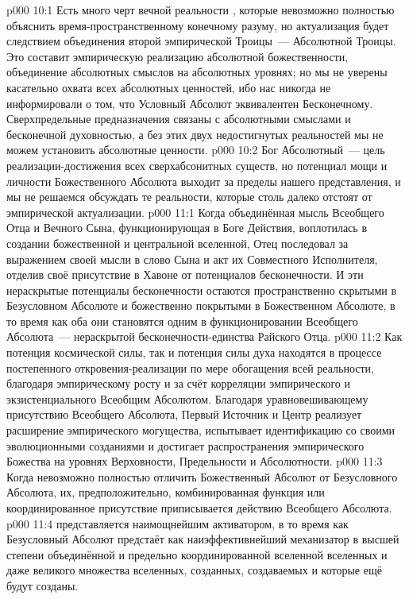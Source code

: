 \vs p000 10:1 Есть много черт вечной реальности , которые невозможно полностью объяснить время\hyp{}пространственному конечному разуму, но актуализация  будет следствием объединения второй эмпирической Троицы~--- Абсолютной Троицы. Это составит эмпирическую реализацию абсолютной божественности, объединение абсолютных смыслов на абсолютных уровнях; но мы не уверены касательно охвата всех абсолютных ценностей, ибо нас никогда не информировали о том, что Условный Абсолют эквивалентен Бесконечному. Сверхпредельные предназначения связаны с абсолютными смыслами и бесконечной духовностью, а без этих двух недостигнутых реальностей мы не можем установить абсолютные ценности.
\vs p000 10:2 Бог Абсолютный~--- цель реализации\hyp{}достижения всех сверхабсонитных существ, но потенциал мощи и личности Божественного Абсолюта выходит за пределы нашего представления, и мы не решаемся обсуждать те реальности, которые столь далеко отстоят от эмпирической актуализации.
\vs p000 11:1 Когда объединённая мысль Всеобщего Отца и Вечного Сына, функционирующая в Боге Действия, воплотилась в создании божественной и центральной вселенной, Отец последовал за выражением своей мысли в слово Сына и акт их Совместного Исполнителя, отделив своё присутствие в Хавоне от потенциалов бесконечности. И эти нераскрытые потенциалы бесконечности остаются пространственно скрытыми в Безусловном Абсолюте и божественно покрытыми в Божественном Абсолюте, в то время как оба они становятся одним в функционировании Всеобщего Абсолюта~--- нераскрытой бесконечности\hyp{}единства Райского Отца.
\vs p000 11:2 Как потенция космической силы, так и потенция силы духа находятся в процессе постепенного откровения\hyp{}реализации по мере обогащения всей реальности, благодаря эмпирическому росту и за счёт корреляции эмпирического и экзистенциального Всеобщим Абсолютом. Благодаря уравновешивающему присутствию Всеобщего Абсолюта, Первый Источник и Центр реализует расширение эмпирического могущества, испытывает идентификацию со своими эволюционными созданиями и достигает распространения эмпирического Божества на уровнях Верховности, Предельности и Абсолютности.
\vs p000 11:3 \pc Когда невозможно полностью отличить Божественный Абсолют от Безусловного Абсолюта, их, предположительно, комбинированная функция или координированное присутствие приписывается действию Всеобщего Абсолюта.
\vs p000 11:4 \pc {} представляется наимощнейшим активатором, в то время как Безусловный Абсолют предстаёт как наиэффективнейший механизатор в высшей степени объединённой и предельно координированной вселенной вселенных и даже великого множества вселенных, созданных, создаваемых и которые ещё будут созданы.
